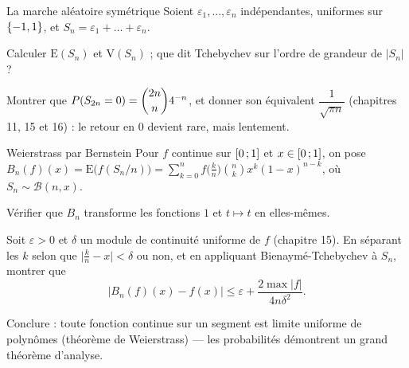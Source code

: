 \begin{exercice}[3]{La marche aléatoire symétrique}
Soient $\varepsilon_1,\dots,\varepsilon_n$ indépendantes, uniformes sur
$\left\{-1,1\right\}$, et $S_n=\varepsilon_1+\dots+\varepsilon_n$.
\begin{questions}
  \item Calculer $\mathrm{E}(S_n)$ et $\mathrm{V}(S_n)$ ; que dit
    Tchebychev sur l'ordre de grandeur de $|S_n|$ ?
  \item Montrer que $P(S_{2n}=0)=\dbinom{2n}{n}4^{-n}$, et donner son
    équivalent $\dfrac{1}{\sqrt{\pi n}}$ (chapitres 11, 15 et 16) :
    le retour en $0$ devient rare, mais lentement.
\end{questions}
\end{exercice}

\begin{exercice}[3]{Weierstrass par Bernstein}
Pour $f$ continue sur $\mathopen{[}0\,{;}\,1\mathclose{]}$ et $x\in\mathopen{[}0\,{;}\,1\mathclose{]}$, on pose
$B_n(f)(x)=\mathrm{E}\bigl(f(S_n/n)\bigr)
=\displaystyle\sum_{k=0}^{n}f\bigl(\tfrac kn\bigr)\binom nk
x^{k}(1-x)^{n-k}$, où $S_n\sim\mathcal{B}(n,x)$.
\begin{questions}
  \item Vérifier que $B_n$ transforme les fonctions $1$ et
    $t\mapsto t$ en elles-mêmes.
  \item Soit $\varepsilon>0$ et $\delta$ un module de continuité uniforme
    de $f$ (chapitre 15). En séparant les $k$ selon que
    $\bigl|\tfrac kn-x\bigr|<\delta$ ou non, et en appliquant
    Bienaymé-Tchebychev à $S_n$, montrer que
    \[
    \bigl|B_n(f)(x)-f(x)\bigr|
    \leqslant\varepsilon+\frac{2\max|f|}{4n\delta^{2}} .
    \]
  \item Conclure : toute fonction continue sur un segment est limite
    uniforme de polynômes (théorème de Weierstrass) — les probabilités
    démontrent un grand théorème d'analyse.
\end{questions}
\end{exercice}


